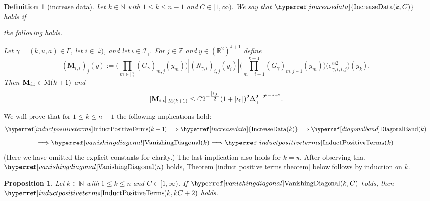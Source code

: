 \documentclass[12pt,reqno]{amsart}
\theoremstyle{plain}
\newtheorem{proposition}[theorem]{Proposition}
\newtheorem{definition}[theorem]{Definition}
\numberwithin{equation}{section}
\theoremstyle{remark}
\newcommand{\uses}[1]{}
\newcommand{\usesdefs}[1]{}
\newcommand{\N}{{\mathbb N}}
\newcommand{\M}{\mathbf{M}}
\begin{document}
\newcommand{\IncreaseData}[1]{{\hyperref[increase data]{{\rm IncreaseData}(#1)}}}
\begin{definition}[increase data]\label{increase data}\uses{}\usesdefs{geometric parameters,kernel sequences,2D Gaussians,L multiplier,N multiplier}
Let $k\in \N$ with $1\le k\le n-1$ and $C\in [1,\infty)$.
We say that $\IncreaseData{k,C}$ holds if

the following holds.

Let $\gamma=(k,u,a)\in \Gamma$, let $i\in [k)$, and let
$\iota\in\mathcal{I}_{\gamma}$.
For $j\in\mathbb Z$ and $y\in(\mathbb R^2)^{k+1}$ define
\begin{equation}\label{auto:increased-data-kernel}
    (\M_{i,\iota})_j(y):=
    \Big(\prod_{m\in [i)} (G_\gamma)_{m,j}(y_m)\Big)
    |(N_{\gamma,\iota})_{i,j}(y_i)|
    \Big(\prod_{m=i+1}^{k-1} (G_\gamma)_{m,j-1}(y_m)\Big)
    \bigl(\sigma_{\gamma,\iota,i,j}^{\otimes 2}\bigr)(y_{k}) .
\end{equation}
Then $\M_{i,\iota}\in {\rm M}(k+1)$ and
\begin{equation}\label{auto:increased-data-M-norm-bound}
  \|\M_{i,\iota}\|_{{\rm M}(k+1)}
  \le
  C 2^{-\tfrac{|\iota_0|}{2}}(1+|\iota_0|)^2
  \Delta_\gamma^{2-2^{k-n+2}} .
\end{equation}
\end{definition}
We will prove that for $1\le k\le n-1$ the following implications hold:
\begin{equation}\label{auto:induction-implication-chain-first} \InductPositiveTerms{k+1} \Longrightarrow \IncreaseData{k} \Longrightarrow \DiagonalBand{k} \end{equation}
\begin{equation}\label{auto:induction-implication-chain-second} \Longrightarrow \VanishingDiagonal{k} \Longrightarrow \InductPositiveTerms{k} \end{equation}
(Here we have omitted the explicit constants for clarity.)
The last implication also holds for $k=n$. After observing that $\VanishingDiagonal{n}$ holds,
Theorem \ref{induct positive terms theorem} below follows by induction on $k$.

\begin{proposition}
\label{vanishing diagonal implies induct positive terms}\uses{positive terms,telescoping terms}\usesdefs{geometric parameters,kernel sequences,sandwich kernel,auto:Gaussian-difference-kernel-definition,s multiplier,H multiplier,induct positive terms,vanishing diagonal}
Let $k\in\N$ with $1\le k\le n$ and $C\in [1,\infty)$.
If $\VanishingDiagonal{k,C}$ holds, then $\InductPositiveTerms{k,kC+2}$ holds.
\end{proposition}
\end{document}

